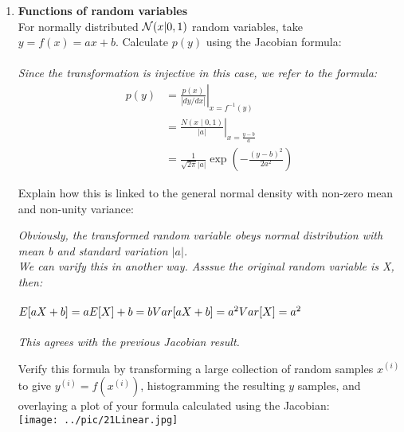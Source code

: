 \documentclass[12pt]{article}
\begin{document}
\begin{enumerate}
\item {\bf Functions of random variables}\\
For normally distributed ${\cal N}(x|0,1)$ random variables, take $y=f(x)=ax+b$. Calculate $p(y)$ using the Jacobian formula:
\\\\
{\em
Since the transformation is injective in this case, we refer to the formula:
\begin{equation*}
\begin{split}
  p(y)& = \left.\frac{p(x)}{|dy/dx|}\right|_{x=f^{-1}(y)} \\
      & = \left.\frac{N\left(x\middle|0,1\right)}{|a|}\right|_{x=\frac{y-b}{a}} \\
      & = \frac{1}{\sqrt{2\pi}|a|}\exp{(-\frac{(y-b)^2}{2a^2})}
\end{split}
\end{equation*}
}
\vspace{1cm}


Explain how this is linked to the general normal density with non-zero mean and non-unity variance:

{\em
Obviously, the transformed random variable obeys normal distribution with mean b and standard variation \begin{math} |a| \end{math}.\\
We can varify this in another way. Asssue the original random variable is X, then:\\\\
\begin{math}
E[aX+b] = aE[X] + b = b \\
Var[aX+b] = a^2Var[X] = a^2  
\end{math}
\\\\
This agrees with the previous Jacobian result.
}
\vspace{3in}

Verify this formula by transforming a large collection of random samples $x^{(i)}$ to give $y^{(i)}=f(x^{(i)})$, histogramming the resulting $y$ samples, and overlaying a plot of your formula calculated using the Jacobian:
\\
\texttt{[image: ../pic/21Linear.jpg]}

\vspace{1cm}


\end{enumerate}
\end{document}
